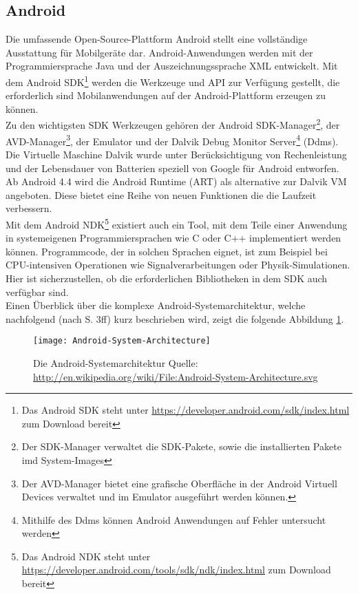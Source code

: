\subsection{Android}
Die umfassende Open-Source-Plattform Android stellt eine vollständige Ausstattung für Mobilgeräte dar. Android-Anwendungen werden mit der Programmiersprache Java und der Auszeichnungssprache \gls{XML} entwickelt. Mit dem Android \gls{SDK}\footnote{ Das Android \gls{SDK} steht unter \url{https://developer.android.com/sdk/index.html} zum Download bereit} werden die Werkzeuge und \gls{API} zur Verfügung gestellt, die erforderlich sind Mobilanwendungen auf der Android-Plattform erzeugen zu können.\\ 
Zu den wichtigsten \gls{SDK} Werkzeugen gehören der Android \gls{SDK}-Manager\footnote{ Der \gls{SDK}-Manager verwaltet die \gls{SDK}-Pakete, sowie die installierten Pakete imd System-Images}, der AVD-Manager\footnote{ Der AVD-Manager bietet eine grafische Oberfläche in der Android Virtuell Devices verwaltet und im Emulator ausgeführt werden können.}, der Emulator und der Dalvik Debug Monitor Server\footnote{ Mithilfe des Ddms können Android Anwendungen auf Fehler untersucht werden} (Ddms). Die Virtuelle Maschine Dalvik wurde unter Berücksichtigung von Rechenleistung und der Lebensdauer von Batterien speziell von Google für Android entworfen. \cite{android_sdk} Ab Android 4.4 wird die Android Runtime (ART) als alternative zur Dalvik \gls{VM} angeboten. Diese bietet eine Reihe von neuen Funktionen die die Laufzeit verbessern. \cite{android:art}\\
Mit dem Android \gls{NDK}\footnote{ Das Android \gls{NDK} steht unter \url{https://developer.android.com/tools/sdk/ndk/index.html} zum Download bereit} existiert auch ein Tool, mit dem Teile einer Anwendung in systemeigenen Programmiersprachen wie C oder C++ implementiert werden können. Programmcode, der in solchen Sprachen eignet, ist zum Beispiel bei CPU-intensiven Operationen wie Signalverarbeitungen oder Physik-Simulationen. Hier ist sicherzustellen, ob die erforderlichen Bibliotheken in dem \gls{SDK} auch verfügbar sind. \cite{android_ndk} \\
Einen Überblick über die komplexe Android-Systemarchitektur, welche nachfolgend (nach \cite{android} S. 3ff) kurz beschrieben wird, zeigt die folgende Abbildung \ref{fig:android}.
\begin{figure}[H]  
    \centering  
    \texttt{[image: Android-System-Architecture]} 
    \caption[Android-Systemarchitektur]{Die Android-Systemarchitektur Quelle: \url{http://en.wikipedia.org/wiki/File:Android-System-Architecture.svg}}
    \label{fig:android}
\end{figure}
